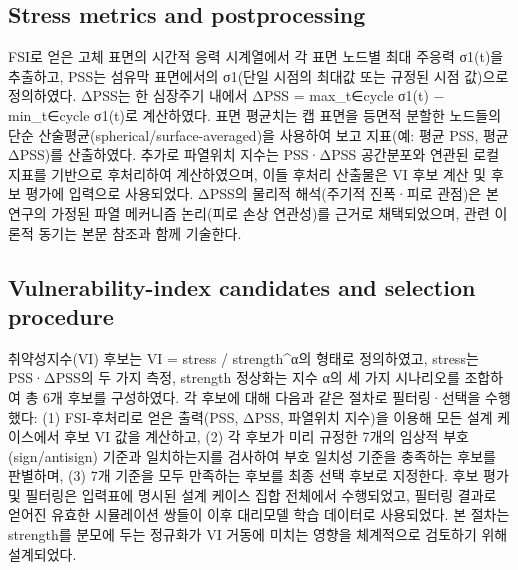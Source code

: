 \documentclass[preprint,12pt]{elsarticle}
\begin{document}
\subsection{Stress metrics and postprocessing}
FSI로 얻은 고체 표면의 시간적 응력 시계열에서 각 표면 노드별 최대 주응력 σ1(t)을 추출하고, PSS는 섬유막 표면에서의 σ1(단일 시점의 최대값 또는 규정된 시점 값)으로 정의하였다. ΔPSS는 한 심장주기 내에서 ΔPSS = max\_{t∈cycle} σ1(t) − min\_{t∈cycle} σ1(t)로 계산하였다. 표면 평균치는 캡 표면을 등면적 분할한 노드들의 단순 산술평균(spherical/surface-averaged)을 사용하여 보고 지표(예: 평균 PSS, 평균 ΔPSS)를 산출하였다. 추가로 파열위치 지수는 PSS·ΔPSS 공간분포와 연관된 로컬 지표를 기반으로 후처리하여 계산하였으며, 이들 후처리 산출물은 VI 후보 계산 및 후보 평가에 입력으로 사용되었다. ΔPSS의 물리적 해석(주기적 진폭·피로 관점)은 본 연구의 가정된 파열 메커니즘 논리(피로 손상 연관성)를 근거로 채택되었으며, 관련 이론적 동기는 본문 참조과 함께 기술한다.

\subsection{Vulnerability-index candidates and selection procedure}
취약성지수(VI) 후보는 VI = stress / strength\textasciicircum α의 형태로 정의하였고, stress는 PSS·ΔPSS의 두 가지 측정, strength 정상화는 지수 α의 세 가지 시나리오를 조합하여 총 6개 후보를 구성하였다. 각 후보에 대해 다음과 같은 절차로 필터링·선택을 수행했다: (1) FSI-후처리로 얻은 출력(PSS, ΔPSS, 파열위치 지수)을 이용해 모든 설계 케이스에서 후보 VI 값을 계산하고, (2) 각 후보가 미리 규정한 7개의 임상적 부호(sign/antisign) 기준과 일치하는지를 검사하여 부호 일치성 기준을 충족하는 후보를 판별하며, (3) 7개 기준을 모두 만족하는 후보를 최종 선택 후보로 지정한다. 후보 평가 및 필터링은 입력표에 명시된 설계 케이스 집합 전체에서 수행되었고, 필터링 결과로 얻어진 유효한 시뮬레이션 쌍들이 이후 대리모델 학습 데이터로 사용되었다. 본 절차는 strength를 분모에 두는 정규화가 VI 거동에 미치는 영향을 체계적으로 검토하기 위해 설계되었다.
\end{document}
